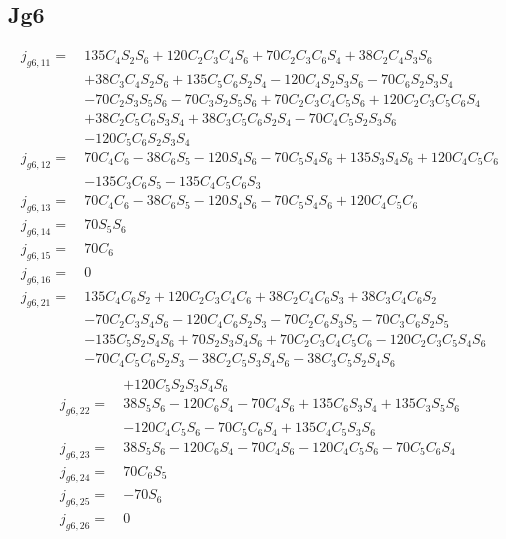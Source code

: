 \subsection{ Jg6 }
\begin{equation*}
\begin{split}
j_{g6,11} =\  &135C_4S_2S_6 + 120C_2C_3C_4S_6 + 70C_2C_3C_6S_4 + 38C_2C_4S_3S_6\\
		 	  & + 38C_3C_4S_2S_6+ 135C_5C_6S_2S_4 - 120C_4S_2S_3S_6 - 70C_6S_2S_3S_4\\
		 	  & - 70C_2S_3S_5S_6 - 70C_3S_2S_5S_6+ 70C_2C_3C_4C_5S_6 + 120C_2C_3C_5C_6S_4\\
		 	  & + 38C_2C_5C_6S_3S_4 + 38C_3C_5C_6S_2S_4- 70C_4C_5S_2S_3S_6\\
		 	  & - 120C_5C_6S_2S_3S_4\\
j_{g6,12} =\  &70C_4C_6 - 38C_6S_5 - 120S_4S_6 - 70C_5S_4S_6 + 135S_3S_4S_6 + 120C_4C_5C_6\\
		 	  & - 135C_3C_6S_5- 135C_4C_5C_6S_3\\   
j_{g6,13} =\  &70C_4C_6 - 38C_6S_5 - 120S_4S_6 - 70C_5S_4S_6 + 120C_4C_5C_6\\
j_{g6,14} =\  &70S_5S_6\\
j_{g6,15} =\  &70C_6\\
j_{g6,16} =\  &0\\
j_{g6,21} =\  &135C_4C_6S_2 + 120C_2C_3C_4C_6 + 38C_2C_4C_6S_3 + 38C_3C_4C_6S_2\\
		 	  & - 70C_2C_3S_4S_6 - 120C_4C_6S_2S_3 - 70C_2C_6S_3S_5 - 70C_3C_6S_2S_5\\
		 	  & - 135C_5S_2S_4S_6 + 70S_2S_3S_4S_6 + 70C_2C_3C_4C_5C_6 - 120C_2C_3C_5S_4S_6\\
		 	  & - 70C_4C_5C_6S_2S_3 - 38C_2C_5S_3S_4S_6 - 38C_3C_5S_2S_4S_6\\
\end{split}
\end{equation*}
\begin{equation*}
\begin{split}
		 	  & + 120C_5S_2S_3S_4S_6\\
j_{g6,22} =\  &38S_5S_6 - 120C_6S_4 - 70C_4S_6 + 135C_6S_3S_4 + 135C_3S_5S_6\\
		 	  & - 120C_4C_5S_6 - 70C_5C_6S_4 + 135C_4C_5S_3S_6\\
j_{g6,23} =\  &38S_5S_6 - 120C_6S_4 - 70C_4S_6 - 120C_4C_5S_6 - 70C_5C_6S_4\\
j_{g6,24} =\  &70C_6S_5\\
j_{g6,25} =\  &-70S_6\\
j_{g6,26} =\  &0\\
\end{split}
\end{equation*}